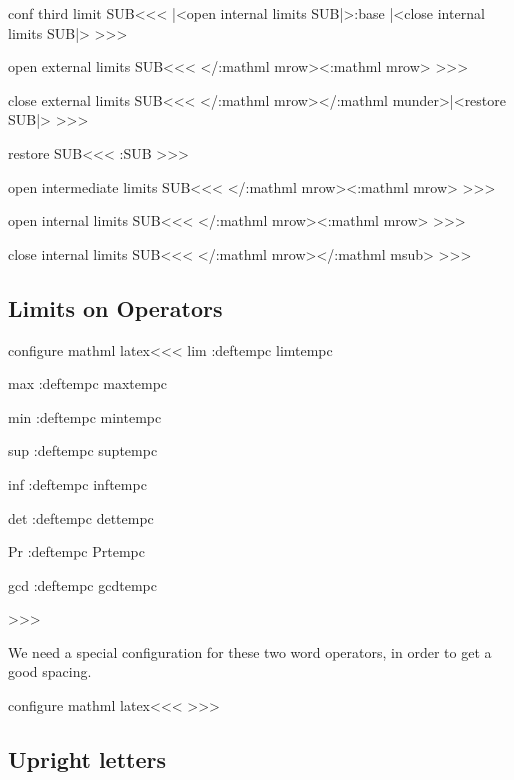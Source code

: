 {{{{{{\<conf third limit SUB\><<<
   {|<open internal limits SUB|>\bgroup \trap:base}
   {\egroup |<close internal limits SUB|>}%
>>>


\<open external limits SUB\><<<
%
\Tg</\a:mathml mrow>\Tg<\a:mathml mrow\Hnewline>%
>>>

\<close external limits SUB\><<<
\Tg</\a:mathml mrow>\TG</\a:mathml
              munder\Hnewline>\aftergroup|<restore SUB|>%
>>>

\<restore SUB\><<<
\pl:SUB >>>

\<open intermediate limits SUB\><<<
%
\Tg</\a:mathml mrow>\Tg<\a:mathml mrow\Hnewline>%
>>>

\<open internal limits SUB\><<<
%
\Tg</\a:mathml mrow>\Tg<\a:mathml mrow\Hnewline>%
>>>

\<close internal limits SUB\><<<
\Tg</\a:mathml mrow>\TG</\a:mathml msub\Hnewline>%
>>>

\subsection{Limits on Operators}


\<configure mathml latex\><<<
\def\:tempb#1{%
   \expandafter\let\expandafter\:tempc\csname #1\endcsname
   \append:def\:tempc{\limits}%
   \expandafter\HLet\csname #1\endcsname\:tempc
}
\:tempb{lim}
\:tempb{max}
\:tempb{min}
\:tempb{sup}
\:tempb{inf}
\:tempb{det}
\:tempb{Pr}
\:tempb{gcd}


>>>

We need a special configuration for these two word operators, in order to get a good spacing.

\<configure mathml latex\><<<
\def\:limspaces#1#2{\HCode{<\a:mathml mi>#1</\a:mathml mi><\a:mathml mspace class="thinspace"  width="0.17em"></\a:mathml mspace><\a:mathml mi>#2</\a:mathml mi><\a:mathml mspace class="thinspace" width="0.17em"></\a:mathml mspace>}}
\def\:tempa{\limits}
\HLet\limsup\:tempa
\def\:tempa{\limits}
\HLet\liminf\:tempa
>>>

\subsection{Upright letters}

}}}}}}
